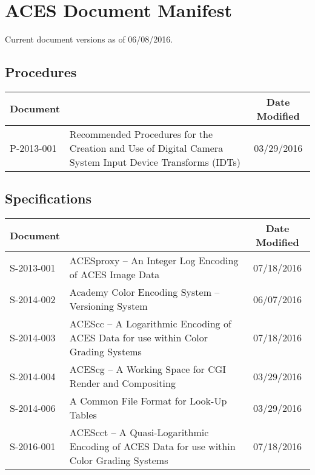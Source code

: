 \documentclass[10pt]{academydoc}
\begin{document}
\regularsectionformat

\section*{ACES Document Manifest}
Current document versions as of 06/08/2016.

\subsection*{Procedures}
\begin{tabularx}{\linewidth}{|l X|c|}
\hline
\textbf{Document} & & \textbf{Date Modified} \\ \hline
P-2013-001 & Recommended Procedures for the Creation and Use of Digital Camera System Input Device Transforms (IDTs) & 03/29/2016 \\ \hline
\end{tabularx}

\subsection*{Specifications}
\begin{tabularx}{\linewidth}{|l X|c|}
\hline
\textbf{Document} & & \textbf{Date Modified} \\ \hline
S-2013-001 & ACESproxy -- An Integer Log Encoding of ACES Image Data & 07/18/2016 \\ \hline
S-2014-002 & Academy Color Encoding System -- Versioning System & 06/07/2016 \\ \hline
S-2014-003 & ACEScc -- A Logarithmic Encoding of ACES Data for use within Color Grading Systems & 07/18/2016 \\ \hline
S-2014-004 & ACEScg -- A Working Space for CGI Render and Compositing & 03/29/2016 \\ \hline
S-2014-006 & A Common File Format for Look-Up Tables & 03/29/2016 \\ \hline
S-2016-001 & ACEScct -- A Quasi-Logarithmic Encoding of ACES Data for use within Color Grading Systems & 07/18/2016 \\ \hline
\end{tabularx}
\end{document}
